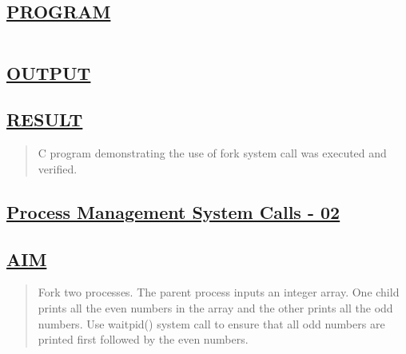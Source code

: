 \documentclass[a4paper, 12pt]{article}
\begin{document}
\subsection*{\underline{PROGRAM}}
\begin{quote}
\inputminted[fontsize=\small,breaklines,breakanywhere]{c}{fork_process_demo.c}%
\end{quote}

\newpage
\subsection*{\underline{OUTPUT}}

\begin{figure}[H] 
    \centering
\end{figure}


\subsection*{\underline{RESULT}}
\begin{quote}
C program demonstrating the use of fork system call was executed and verified.
\end{quote}

\newpage
\begin{center}
\section*{\LARGE \textbf{\underline{Process Management System Calls - 02}}} 
\end{center}

\subsection*{\underline{AIM}}
\begin{quote}
Fork two processes. The parent process inputs an integer array. One child prints all the
even numbers in the array and the other prints all the odd numbers. Use waitpid() system
call to ensure that all odd numbers are printed first followed by the even numbers.
\end{quote}
\end{document}
